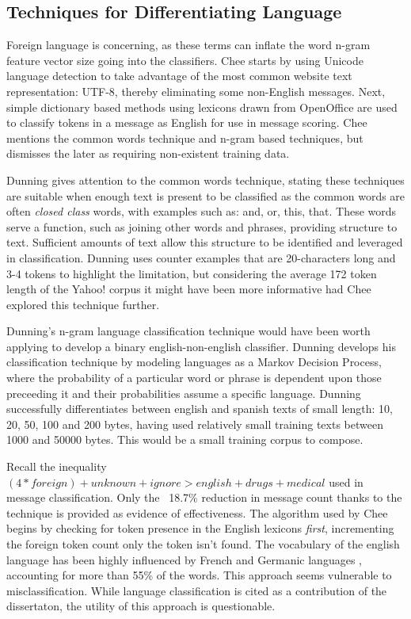 \documentclass[twoside,11pt]{article}
\begin{document}
\subsection{Techniques for Differentiating Language}
Foreign language is concerning, as these terms can inflate the word n-gram feature vector size going into the classifiers. Chee starts by using Unicode language detection to take advantage of the most common website text representation: UTF-8, thereby eliminating some non-English messages. Next, simple dictionary based methods using lexicons drawn from OpenOffice are used to classify tokens in a message as English for use in message scoring. Chee mentions the common words technique and n-gram based techniques, but dismisses the later as requiring non-existent training data.
\par Dunning \citep{Dunning} gives attention to the common words technique, stating these techniques are suitable when enough text is present to be classified as the common words are often \textit{closed class} words, with examples such as: and, or, this, that. These words serve a function, such as joining other words and phrases, providing structure to text. Sufficient amounts of text allow this structure to be identified and leveraged in classification. Dunning uses counter examples that are 20-characters long and 3-4 tokens to highlight the limitation, but considering the average 172 token length of the Yahoo! corpus it might have been more informative had Chee explored this technique further.
\par Dunning's n-gram language classification technique would have been worth applying to develop a binary english-non-english classifier. Dunning develops his classification technique by modeling languages as a Markov Decision Process, where the probability of a particular word or phrase is dependent upon those preceeding it and their probabilities assume a specific language. Dunning successfully differentiates between english and spanish texts of small length: 10, 20, 50, 100 and 200 bytes, having used relatively small training texts between 1000 and 50000 bytes. This would be a small training corpus to compose.
\par Recall the inequality $(4 * foreign) + unknown + ignore > english + drugs + medical$ used in message classification. Only the ~18.7\% reduction in message count thanks to the technique is provided as evidence of effectiveness. The algorithm used by Chee begins by checking for token presence in the English lexicons \textit{first}, incrementing the foreign token count only the token isn't found. The vocabulary of the english language has been highly influenced by French and Germanic languages \citep{Wikipedia page for english}, accounting for more than 55\% of the words. This approach seems vulnerable to misclassification. While language classification is cited as a contribution of the dissertaton, the utility of this approach is questionable.
\end{document}
